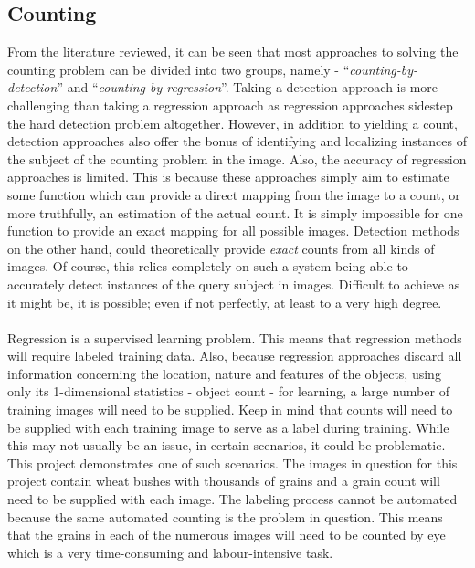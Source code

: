 \subsection{Counting}
From the literature reviewed, it can be seen that most approaches to solving the counting problem can be divided into two groups, namely - ``\textit{counting-by-detection}'' and ``\textit{counting-by-regression}''. Taking a detection approach is more challenging than taking a regression approach as regression approaches sidestep the hard detection problem altogether. However, in addition to yielding a count, detection approaches also offer the bonus of identifying and localizing instances of the subject of the counting problem in the image. Also, the accuracy of regression approaches is limited. This is because these approaches simply aim to estimate some function which can provide a direct mapping from the image to a count, or more truthfully, an estimation of the actual count. It is simply impossible for one function to provide an exact mapping for all possible images. Detection methods on the other hand, could theoretically provide \textit{exact} counts from all kinds of images. Of course, this relies completely on such a system being able to accurately detect instances of the query subject in images. Difficult to achieve as it might be, it is possible; even if not perfectly, at least to a very high degree.\\ \\
%
Regression is a supervised learning problem. This means that regression methods will require labeled training data. Also, because regression approaches discard all information concerning the location, nature and features of the objects, using only its 1-dimensional statistics - object count - for learning, a large number of training images will need to be supplied. Keep in mind that counts will need to be supplied with each training image to serve as a label during training. While this may not usually be an issue, in certain scenarios, it could be problematic. This project demonstrates one of such scenarios. The images in question for this project contain wheat bushes with thousands of grains and a grain count will need to be supplied with each image. The labeling process cannot be automated because the same automated counting is the problem in question. This means that the grains in each of the numerous images will need to be counted by eye which is a very time-consuming and labour-intensive task.\\ \\
%

